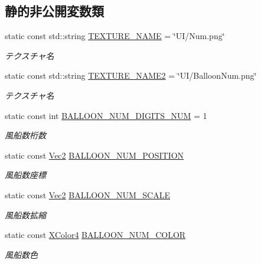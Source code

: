 \subsection*{静的非公開変数類}
\begin{DoxyCompactItemize}
\item 
static const std\+::string \mbox{\hyperlink{class_balloon_num_draw_a157b9b31fced0105f44da9c6b09f22c6}{T\+E\+X\+T\+U\+R\+E\+\_\+\+N\+A\+ME}} = \char`\"{}UI/Num.\+png\char`\"{}
\begin{DoxyCompactList}\small\item\em テクスチャ名 \end{DoxyCompactList}\item 
static const std\+::string \mbox{\hyperlink{class_balloon_num_draw_a5eb4b6057eb7c5bc6ab1fe5226b63b38}{T\+E\+X\+T\+U\+R\+E\+\_\+\+N\+A\+M\+E2}} = \char`\"{}UI/Balloon\+Num.\+png\char`\"{}
\begin{DoxyCompactList}\small\item\em テクスチャ名 \end{DoxyCompactList}\item 
static const int \mbox{\hyperlink{class_balloon_num_draw_ace62ebf1a2e5ae12c567d76f009240ee}{B\+A\+L\+L\+O\+O\+N\+\_\+\+N\+U\+M\+\_\+\+D\+I\+G\+I\+T\+S\+\_\+\+N\+UM}} = 1
\begin{DoxyCompactList}\small\item\em 風船数桁数 \end{DoxyCompactList}\item 
static const \mbox{\hyperlink{_vector3_d_8h_a5ef6e95dfc5f9d3820b71772d99bbc25}{Vec2}} \mbox{\hyperlink{class_balloon_num_draw_a59f2f46ec0a4c6c49b9641a88aefe07a}{B\+A\+L\+L\+O\+O\+N\+\_\+\+N\+U\+M\+\_\+\+P\+O\+S\+I\+T\+I\+ON}}
\begin{DoxyCompactList}\small\item\em 風船数座標 \end{DoxyCompactList}\item 
static const \mbox{\hyperlink{_vector3_d_8h_a5ef6e95dfc5f9d3820b71772d99bbc25}{Vec2}} \mbox{\hyperlink{class_balloon_num_draw_aa7d0b2a81457fbbbc5c031a916b7281f}{B\+A\+L\+L\+O\+O\+N\+\_\+\+N\+U\+M\+\_\+\+S\+C\+A\+LE}}
\begin{DoxyCompactList}\small\item\em 風船数拡縮 \end{DoxyCompactList}\item 
static const \mbox{\hyperlink{_vector3_d_8h_a680c30c4a07d86fe763c7e01169cd6cc}{X\+Color4}} \mbox{\hyperlink{class_balloon_num_draw_a845d2d3d93827549b65b4018244439c9}{B\+A\+L\+L\+O\+O\+N\+\_\+\+N\+U\+M\+\_\+\+C\+O\+L\+OR}}
\begin{DoxyCompactList}\small\item\em 風船数色 \end{DoxyCompactList}\end{DoxyCompactItemize}



